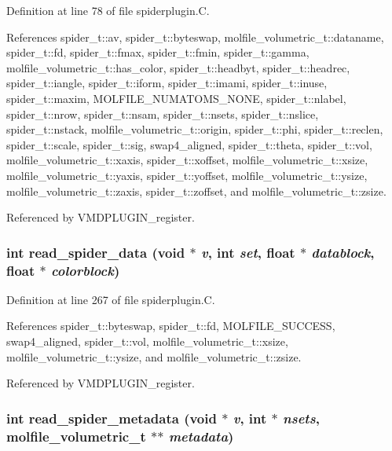 Definition at line 78 of file spiderplugin.C.

References spider\_\-t::av, spider\_\-t::byteswap, molfile\_\-volumetric\_\-t::dataname, spider\_\-t::fd, spider\_\-t::fmax, spider\_\-t::fmin, spider\_\-t::gamma, molfile\_\-volumetric\_\-t::has\_\-color, spider\_\-t::headbyt, spider\_\-t::headrec, spider\_\-t::iangle, spider\_\-t::iform, spider\_\-t::imami, spider\_\-t::inuse, spider\_\-t::maxim, MOLFILE\_\-NUMATOMS\_\-NONE, spider\_\-t::nlabel, spider\_\-t::nrow, spider\_\-t::nsam, spider\_\-t::nsets, spider\_\-t::nslice, spider\_\-t::nstack, molfile\_\-volumetric\_\-t::origin, spider\_\-t::phi, spider\_\-t::reclen, spider\_\-t::scale, spider\_\-t::sig, swap4\_\-aligned, spider\_\-t::theta, spider\_\-t::vol, molfile\_\-volumetric\_\-t::xaxis, spider\_\-t::xoffset, molfile\_\-volumetric\_\-t::xsize, molfile\_\-volumetric\_\-t::yaxis, spider\_\-t::yoffset, molfile\_\-volumetric\_\-t::ysize, molfile\_\-volumetric\_\-t::zaxis, spider\_\-t::zoffset, and molfile\_\-volumetric\_\-t::zsize.

Referenced by VMDPLUGIN\_\-register.
\subsubsection{\setlength{\rightskip}{0pt plus 5cm}int read\_\-spider\_\-data (void $\ast$ {\em v}, int {\em set}, float $\ast$ {\em datablock}, float $\ast$ {\em colorblock})\hspace{0.3cm}{\tt  [static]}}\label{spiderplugin_8C_a4}




Definition at line 267 of file spiderplugin.C.

References spider\_\-t::byteswap, spider\_\-t::fd, MOLFILE\_\-SUCCESS, swap4\_\-aligned, spider\_\-t::vol, molfile\_\-volumetric\_\-t::xsize, molfile\_\-volumetric\_\-t::ysize, and molfile\_\-volumetric\_\-t::zsize.

Referenced by VMDPLUGIN\_\-register.
\subsubsection{\setlength{\rightskip}{0pt plus 5cm}int read\_\-spider\_\-metadata (void $\ast$ {\em v}, int $\ast$ {\em nsets}, {\bf molfile\_\-volumetric\_\-t} $\ast$$\ast$ {\em metadata})\hspace{0.3cm}{\tt  [static]}}\label{spiderplugin_8C_a3}




